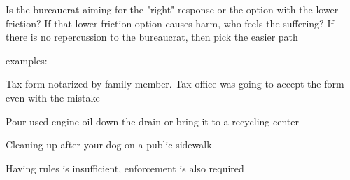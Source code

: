 Is the bureaucrat aiming for the "right" response or the option with the lower friction?
If that lower-friction option causes harm, who feels the suffering?
If there is no repercussion to the bureaucrat, then pick the easier path

examples:

Tax form notarized by family member. Tax office was going to accept the form even with the mistake 

Pour used engine oil down the drain or bring it to a recycling center 

Cleaning up after your dog on a public sidewalk

Having rules is insufficient, enforcement is also required
